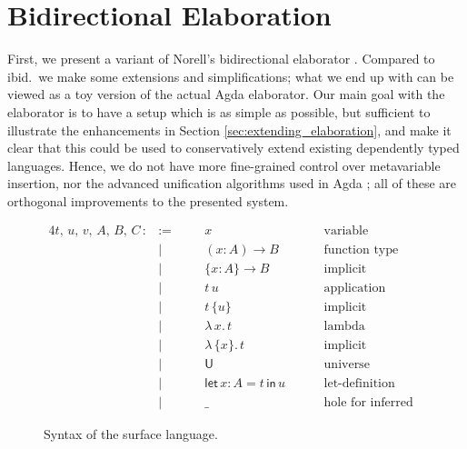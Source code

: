 \documentclass[acmsmall,review,anonymous,prologue,dvipsnames]{acmart}\settopmatter{printfolios=true,printccs=false,printacmref=false}
\newcommand{\slet}{\boldsymbol{\mathsf{let}}}
\renewcommand{\sin}{\boldsymbol{\mathsf{in}}}
\renewcommand{\U}{\mathsf{U}}
\theoremstyle{remark}
\begin{document}
\section{Bidirectional Elaboration}
\label{sec:bidirectional_elaboration}

First, we present a variant of Norell's bidirectional elaborator
\cite[Chapter~3]{norell07thesis}. Compared to ibid.\ we make some extensions and
simplifications; what we end up with can be viewed as a toy version of the
actual Agda elaborator. Our main goal with the elaborator is to have a setup
which is as simple as possible, but sufficient to illustrate the enhancements in
Section \ref{sec:extending_elaboration}, and make it clear that this could be
used to conservatively extend existing dependently typed languages. Hence, we do
not have more fine-grained control over metavariable insertion, nor the advanced
unification algorithms used in Agda \cite{abel2011higher}; all of these are
orthogonal improvements to the presented system.

\begin{figure}[h]
\begin{alignat*}{4}
  t,\,u,\,v,\,A,\,B,\,C\, :&:=\quad  && x\hspace{8em}              & \text{variable}                 &  \\
                           & |       && (x : A)\to B               & \text{function type}            &  \\
                           & |       && \{x : A\}\to B             & \text{implicit function type}   &  \\
                           & |       && t\,u                       & \text{application}              &  \\
                           & |       && t\,\{u\}                   & \text{implicit application}     &  \\
                           & |       && \lambda\,x.\, t            & \text{lambda abstraction}       &  \\
                           & |       && \lambda\,\{x\}.\,t         & \text{implicit abstraction}     &  \\
                           & |       && \U                         & \text{universe}                 &  \\
                           & |       && \slet\,x : A = t\,\sin\, u & \text{let-definition}           &  \\
                           & |       && \_                         & \text{hole for inferred term}   &
\end{alignat*}
\caption{Syntax of the surface language.}
\label{fig:surface}
\end{figure}
\end{document}
